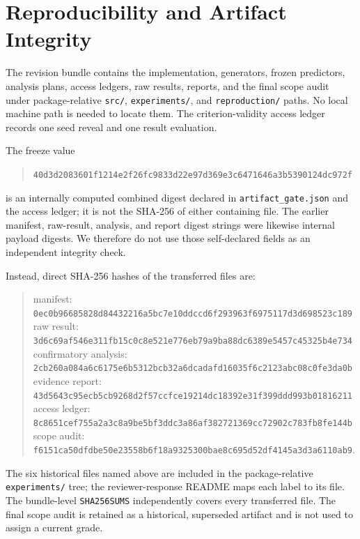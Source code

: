 \section{Reproducibility and Artifact Integrity}
\label{sec:reproducibility}

The revision bundle contains the implementation, generators, frozen predictors,
analysis plans, access ledgers, raw results, reports, and the final scope audit
under package-relative \texttt{src/}, \texttt{experiments/}, and
\texttt{reproduction/} paths.  No local machine path is needed to locate them.
The criterion-validity access ledger records one seed reveal and one result
evaluation.

The freeze value
\begin{quote}\small
\texttt{40d3d2083601f1214e2f26fc9833d22e97d369e3c6471646a3b5390124dc972f}
\end{quote}
is an internally computed combined digest declared in
\texttt{artifact\_gate.json} and the access ledger; it is not the SHA-256 of
either containing file.  The earlier manifest, raw-result, analysis, and report
digest strings were likewise internal payload digests.  We therefore do not use
those self-declared fields as an independent integrity check.

Instead, direct SHA-256 hashes of the transferred files are:
\begin{quote}\small
manifest:\\ \texttt{0ec0b96685828d84432216a5bc7e10ddccd6f293963f6975117d3d698523c189}\\
raw result:\\ \texttt{3d6c69af546e311fb15c0c8e521e776eb79a9ba88dc6389e5457c45325b4e734}\\
confirmatory analysis:\\ \texttt{2cb260a084a6c6175e6b5312bcb32a6dcadafd16035f6c2123abc08c0fe3da0b}\\
evidence report:\\ \texttt{43d5643c95ecb5cb9268d2f57ccfce19214dc18392e31f399ddd993b01816211}\\
access ledger:\\ \texttt{8c8651cef755a2a3c8a9be5bf3ddc3a86af382721369cc72902c783fb8fe144b}\\
scope audit:\\ \texttt{f6151ca50dfdbe50e23558b6f18a9325300bae8c695d52df4145a3d3a6110ab9}.
\end{quote}
The six historical files named above are included in the package-relative
\texttt{experiments/} tree; the reviewer-response README maps each label to its
file.  The bundle-level \texttt{SHA256SUMS} independently covers every transferred file.
The final scope audit is retained as a historical, superseded artifact and is
not used to assign a current grade.

